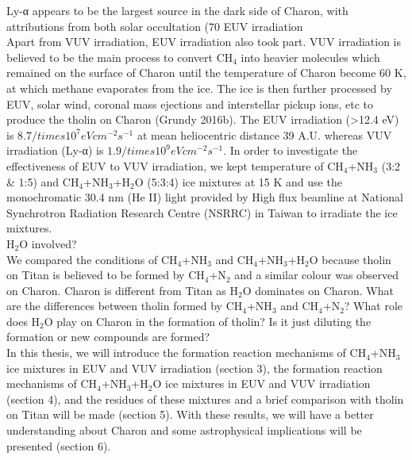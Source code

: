Ly-α appears to be the largest source in the dark side of Charon, with attributions from both solar occultation (70%
EUV irradiation\\
Apart from VUV irradiation, EUV irradiation also took part. VUV irradiation is believed to be the main process to convert CH$_4$ into heavier molecules which remained on the surface of Charon until the temperature of Charon become 60 K, at which methane evaporates from the ice. The ice is then further processed by EUV, solar wind, coronal mass ejections and interstellar pickup ions, etc to produce the tholin on Charon (Grundy 2016b). The EUV irradiation (>12.4 eV) is $8.7 /times 10^7 eV cm^{-2} s^{-1}$ at mean heliocentric distance 39 A.U. whereas VUV irradiation (Ly-α) is $1.9 /times 10^9 eV cm^{-2} s^{-1}$. In order to investigate the effectiveness of EUV to VUV irradiation, we kept temperature of CH$_4$+NH$_3$ (3:2 \& 1:5) and CH$_4$+NH$_3$+H$_2$O (5:3:4) ice mixtures at 15 K and use the monochromatic 30.4 nm (He II) light provided by High flux beamline at National Synchrotron Radiation Research Centre (NSRRC) in Taiwan to irradiate the ice mixtures.\\
H$_2$O involved?\\
We compared the conditions of CH$_4$+NH$_3$ and CH$_4$+NH$_3$+H$_2$O because tholin on Titan is believed to be formed by CH$_4$+N$_2$ and a similar colour was observed on Charon. Charon is different from Titan as H$_2$O dominates on Charon. What are the differences between tholin formed by CH$_4$+NH$_3$ and CH$_4$+N$_2$? What role does H$_2$O play on Charon in the formation of tholin? Is it just diluting the formation or new compounds are formed?\\
In this thesis, we will introduce the formation reaction mechanisms of CH$_4$+NH$_3$ ice mixtures in EUV and VUV irradiation (section 3), the formation reaction mechanisms of CH$_4$+NH$_3$+H$_2$O ice mixtures in EUV and VUV irradiation (section 4), and the residues of these mixtures and a brief comparison with tholin on Titan will be made (section 5). With these results, we will have a better understanding about Charon and some astrophysical implications will be presented (section 6).\\
